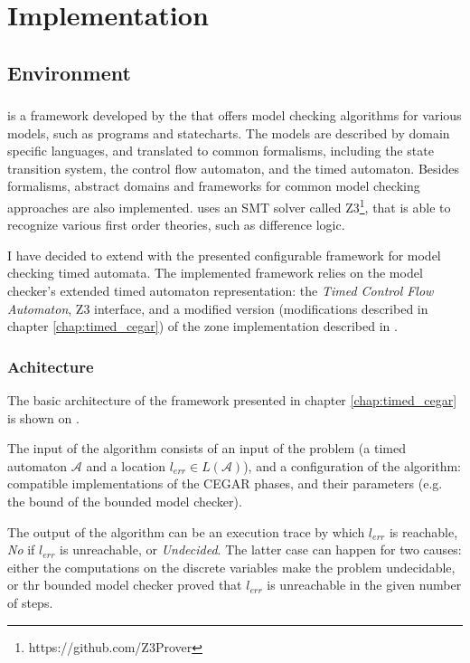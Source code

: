 \chapter{Implementation}\label{chap:impl}

\section{Environment}

\subsection{\ttmc}

\ttmc is a framework developed by the \bmemit that offers model checking algorithms for various models, such as programs and statecharts. The models are described by domain specific languages, and translated to common formalisms, including the state transition system, the control flow automaton, and the timed automaton. Besides formalisms, abstract domains and frameworks for common model checking approaches are also implemented. \ttmc uses an SMT solver called Z3\footnote{https://github.com/Z3Prover}, that is able to recognize various first order theories, such as difference logic.

I have decided to extend \ttmc with the presented configurable framework for model checking timed automata. The implemented framework relies on the model checker's extended timed automaton representation: the \emph{Timed Control Flow Automaton}, Z3 interface, and a modified version (modifications described in chapter \ref{chap:timed_cegar}) of the zone implementation described in \cite{bengtsson2004timed}.

\subsection{Achitecture}


The basic architecture of the framework presented in chapter \ref{chap:timed_cegar} is shown on .

The input of the algorithm consists of an input of the problem (a timed automaton $\mathcal{A}$ and a location $l_{err} \in L(\mathcal{A})$), and a configuration of the algorithm: compatible implementations of the CEGAR phases, and their parameters (e.g. the bound of the bounded model checker).

The output of the algorithm can be an execution trace by which $l_{err}$ is reachable, \emph{No} if $l_{err}$ is unreachable, or \emph{Undecided}. The latter case can happen for two causes: either the computations on the discrete variables make the problem undecidable, or thr bounded model checker proved that $l_{err}$ is unreachable in the given number of steps. 



